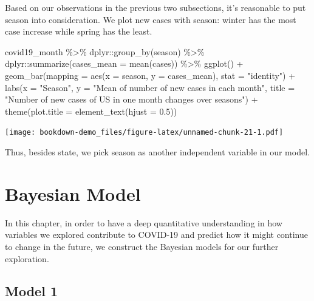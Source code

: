 \documentclass[
]{book}
\newenvironment{Shaded}{\begin{snugshade}}{\end{snugshade}}
\newcommand{\AttributeTok}[1]{\textcolor[rgb]{0.77,0.63,0.00}{#1}}
\newcommand{\FloatTok}[1]{\textcolor[rgb]{0.00,0.00,0.81}{#1}}
\newcommand{\FunctionTok}[1]{\textcolor[rgb]{0.00,0.00,0.00}{#1}}
\newcommand{\NormalTok}[1]{#1}
\newcommand{\SpecialCharTok}[1]{\textcolor[rgb]{0.00,0.00,0.00}{#1}}
\newcommand{\StringTok}[1]{\textcolor[rgb]{0.31,0.60,0.02}{#1}}
\begin{document}
Based on our observations in the previous two subsections, it's reasonable to put season into consideration. We plot new cases with season: winter has the most case increase while spring has the least.

\begin{Shaded}
\begin{Highlighting}[]
\NormalTok{covid19\_month }\SpecialCharTok{\%\textgreater{}\%}
\NormalTok{  dplyr}\SpecialCharTok{::}\FunctionTok{group\_by}\NormalTok{(season) }\SpecialCharTok{\%\textgreater{}\%}
\NormalTok{  dplyr}\SpecialCharTok{::}\FunctionTok{summarize}\NormalTok{(}\AttributeTok{cases\_mean =} \FunctionTok{mean}\NormalTok{(cases)) }\SpecialCharTok{\%\textgreater{}\%}
  \FunctionTok{ggplot}\NormalTok{() }\SpecialCharTok{+}
  \FunctionTok{geom\_bar}\NormalTok{(}\AttributeTok{mapping =} \FunctionTok{aes}\NormalTok{(}\AttributeTok{x =}\NormalTok{ season, }\AttributeTok{y =}\NormalTok{ cases\_mean), }\AttributeTok{stat =} \StringTok{"identity"}\NormalTok{) }\SpecialCharTok{+}
  \FunctionTok{labs}\NormalTok{(}\AttributeTok{x =} \StringTok{"Season"}\NormalTok{, }\AttributeTok{y =} \StringTok{"Mean of number of new cases in each month"}\NormalTok{, }\AttributeTok{title =} \StringTok{"Number of new cases of US in one month changes over seasons"}\NormalTok{) }\SpecialCharTok{+}
  \FunctionTok{theme}\NormalTok{(}\AttributeTok{plot.title =} \FunctionTok{element\_text}\NormalTok{(}\AttributeTok{hjust =} \FloatTok{0.5}\NormalTok{))}
\end{Highlighting}
\end{Shaded}

\texttt{[image: bookdown-demo\_files/figure-latex/unnamed-chunk-21-1.pdf]}

Thus, besides state, we pick season as another independent variable in our model.

\hypertarget{bayesian-model}{%
\chapter{Bayesian Model}\label{bayesian-model}}

In this chapter, in order to have a deep quantitative understanding in how variables we explored contribute to COVID-19 and predict how it might continue to change in the future, we construct the Bayesian models for our further exploration.

\hypertarget{model-1}{%
\section{Model 1}\label{model-1}}
\end{document}
